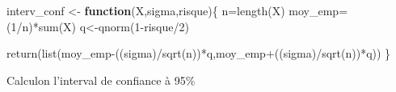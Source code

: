 \documentclass[
]{article}
\newenvironment{Shaded}{\begin{snugshade}}{\end{snugshade}}
\newcommand{\ControlFlowTok}[1]{\textcolor[rgb]{0.13,0.29,0.53}{\textbf{#1}}}
\newcommand{\DecValTok}[1]{\textcolor[rgb]{0.00,0.00,0.81}{#1}}
\newcommand{\FunctionTok}[1]{\textcolor[rgb]{0.00,0.00,0.00}{#1}}
\newcommand{\NormalTok}[1]{#1}
\newcommand{\OtherTok}[1]{\textcolor[rgb]{0.56,0.35,0.01}{#1}}
\newcommand{\SpecialCharTok}[1]{\textcolor[rgb]{0.00,0.00,0.00}{#1}}
\begin{document}
\begin{Shaded}
\begin{Highlighting}[]
\NormalTok{interv\_conf }\OtherTok{\textless{}{-}} \ControlFlowTok{function}\NormalTok{(X,sigma,risque)\{}
\NormalTok{  n}\OtherTok{=}\FunctionTok{length}\NormalTok{(X)}
\NormalTok{  moy\_emp}\OtherTok{=}\NormalTok{ (}\DecValTok{1}\SpecialCharTok{/}\NormalTok{n)}\SpecialCharTok{*}\FunctionTok{sum}\NormalTok{(X)}
\NormalTok{  q}\OtherTok{\textless{}{-}}\FunctionTok{qnorm}\NormalTok{(}\DecValTok{1}\SpecialCharTok{{-}}\NormalTok{risque}\SpecialCharTok{/}\DecValTok{2}\NormalTok{)}
  
  \FunctionTok{return}\NormalTok{(}\FunctionTok{list}\NormalTok{(moy\_emp}\SpecialCharTok{{-}}\NormalTok{((sigma)}\SpecialCharTok{/}\FunctionTok{sqrt}\NormalTok{(n))}\SpecialCharTok{*}\NormalTok{q,moy\_emp}\SpecialCharTok{+}\NormalTok{((sigma)}\SpecialCharTok{/}\FunctionTok{sqrt}\NormalTok{(n))}\SpecialCharTok{*}\NormalTok{q))}
\NormalTok{\}}
\end{Highlighting}
\end{Shaded}

Calculon l'interval de confiance à 95\%
\end{document}
